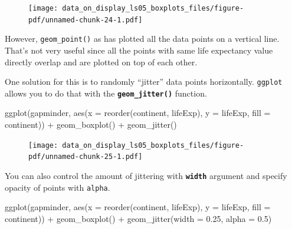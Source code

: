 \documentclass[
  letterpaper,
  DIV=11,
  numbers=noendperiod]{scrreprt}
\newenvironment{Shaded}{\begin{snugshade}}{\end{snugshade}}
\newcommand{\AttributeTok}[1]{\textcolor[rgb]{0.40,0.45,0.13}{#1}}
\newcommand{\FloatTok}[1]{\textcolor[rgb]{0.68,0.00,0.00}{#1}}
\newcommand{\FunctionTok}[1]{\textcolor[rgb]{0.28,0.35,0.67}{#1}}
\newcommand{\NormalTok}[1]{\textcolor[rgb]{0.00,0.23,0.31}{#1}}
\newcommand{\SpecialCharTok}[1]{\textcolor[rgb]{0.37,0.37,0.37}{#1}}
\begin{document}
\begin{figure}[H]

{\centering \texttt{[image: data\_on\_display\_ls05\_boxplots\_files/figure-pdf/unnamed-chunk-24-1.pdf]}

}

\end{figure}

However, \texttt{geom\_point()} as has plotted all the data points on a
vertical line. That's not very useful since all the points with same
life expectancy value directly overlap and are plotted on top of each
other.

One solution for this is to randomly ``jitter'' data points
horizontally. \texttt{ggplot} allows you to do that with the
\textbf{\texttt{geom\_jitter()}} function.

\begin{Shaded}
\begin{Highlighting}[]
\FunctionTok{ggplot}\NormalTok{(gapminder, }
       \FunctionTok{aes}\NormalTok{(}\AttributeTok{x =} \FunctionTok{reorder}\NormalTok{(continent, lifeExp), }
           \AttributeTok{y =}\NormalTok{ lifeExp,}
           \AttributeTok{fill =}\NormalTok{ continent)) }\SpecialCharTok{+}
  \FunctionTok{geom\_boxplot}\NormalTok{() }\SpecialCharTok{+}
  \FunctionTok{geom\_jitter}\NormalTok{()}
\end{Highlighting}
\end{Shaded}

\begin{figure}[H]

{\centering \texttt{[image: data\_on\_display\_ls05\_boxplots\_files/figure-pdf/unnamed-chunk-25-1.pdf]}

}

\end{figure}

You can also control the amount of jittering with
\textbf{\texttt{width}} argument and specify opacity of points with
\texttt{alpha}.

\begin{Shaded}
\begin{Highlighting}[]
\FunctionTok{ggplot}\NormalTok{(gapminder, }
       \FunctionTok{aes}\NormalTok{(}\AttributeTok{x =} \FunctionTok{reorder}\NormalTok{(continent, lifeExp), }
           \AttributeTok{y =}\NormalTok{ lifeExp,}
           \AttributeTok{fill =}\NormalTok{ continent)) }\SpecialCharTok{+}
  \FunctionTok{geom\_boxplot}\NormalTok{() }\SpecialCharTok{+}
  \FunctionTok{geom\_jitter}\NormalTok{(}\AttributeTok{width =} \FloatTok{0.25}\NormalTok{, }
              \AttributeTok{alpha =} \FloatTok{0.5}\NormalTok{)}
\end{Highlighting}
\end{Shaded}
\end{document}
